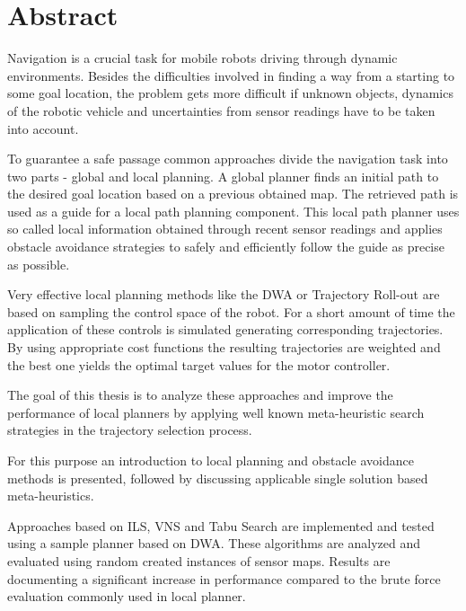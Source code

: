\begingroup
\let\clearpage\relax
\let\cleardoublepage\relax
\let\cleardoublepage\relax

\chapter*{Abstract}
Navigation is a crucial task for mobile robots driving through dynamic environments.
Besides the difficulties involved in finding a way from a starting to some goal location, the problem gets more difficult if unknown objects, dynamics of the robotic vehicle and uncertainties from sensor readings have to be taken into account.

To guarantee a safe passage common approaches divide the navigation task into two parts - global and local planning.
A global planner finds an initial path to the desired goal location based on a previous obtained map. The retrieved path is used as a guide for a local path planning component.
This local path planner uses so called local information obtained through recent sensor readings and applies obstacle avoidance strategies to safely and efficiently follow the guide as precise as possible. 

Very effective local planning methods like the \ac{DWA} or Trajectory Roll-out are based on sampling the control space of the robot. For a short amount of time the application of these controls is simulated generating corresponding trajectories.
By using appropriate cost functions the resulting trajectories are weighted and the best one yields the optimal target values for the motor controller.

The goal of this thesis is to analyze these approaches and improve the performance of local planners by applying well known meta-heuristic search strategies in the trajectory selection process.

For this purpose an introduction to local planning and obstacle avoidance methods is presented,  followed by discussing applicable single solution based meta-heuristics. 

Approaches based on \ac{ILS}, \ac{VNS} and Tabu Search are implemented and tested using a sample planner based on \ac{DWA}. These algorithms are analyzed and evaluated using random created instances of sensor maps. Results are documenting a significant increase in performance compared to the brute force evaluation commonly used in local planner. 

